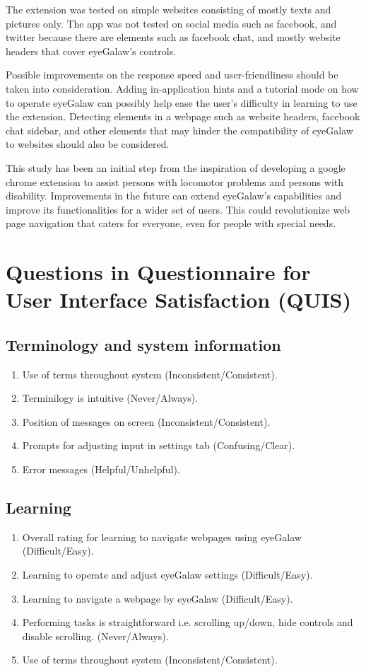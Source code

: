 \documentclass[journal]{./IEEE/IEEEtran}
\begin{document}
The extension was tested on simple websites consisting of mostly texts and pictures only. The app was not tested on social media such as facebook, and twitter because there are elements such as facebook chat, and mostly website headers that cover eyeGalaw's controls. 

Possible improvements on the response speed and user-friendliness should be taken into consideration. Adding  in-application hints and a tutorial mode on how to operate eyeGalaw can possibly help ease the user's difficulty in learning to use the extension. Detecting elements in a webpage such as website headers, facebook chat sidebar, and other elements that may hinder the compatibility of eyeGalaw to websites should also be considered.  

This study has been an initial step from the inspiration of developing a google chrome extension to assist persons with locomotor problems and persons with disability. Improvements in the future can extend eyeGalaw’s capabilities and improve its functionalities for a wider set of users. This could revolutionize web page navigation that caters for everyone, even for people with special needs. 


\appendices

\section{Questions in Questionnaire for User Interface Satisfaction (QUIS)} 
\subsection {Terminology and system information}
\begin{enumerate}
\item Use of terms throughout system (Inconsistent/Consistent).
\item Terminilogy is intuitive (Never/Always).
\item Position of messages on screen (Inconsistent/Consistent).
\item Prompts for adjusting input in settings tab (Confusing/Clear).
\item Error messages (Helpful/Unhelpful).
\end {enumerate}


\subsection {Learning}
\begin{enumerate}
\item Overall rating for learning to navigate webpages using eyeGalaw (Difficult/Easy).
\item Learning to operate and adjust eyeGalaw settings (Difficult/Easy).
\item Learning to navigate a webpage by eyeGalaw  (Difficult/Easy).
\item Performing  tasks is straightforward i.e. scrolling up/down,  hide controls and disable scrolling. (Never/Always).
\item  Use of terms throughout system (Inconsistent/Consistent).
\end {enumerate}
\end{document}
